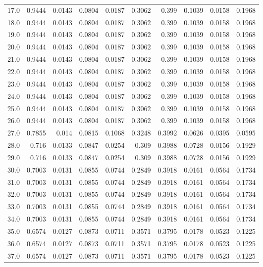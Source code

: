 \begin{longtable}{lrrrrrrrrr}
17.0 & 0.9444 & 0.0143 & 0.0804 & 0.0187 & 0.3062 & 0.399 & 0.1039 & 0.0158 & 0.1968 \\
18.0 & 0.9444 & 0.0143 & 0.0804 & 0.0187 & 0.3062 & 0.399 & 0.1039 & 0.0158 & 0.1968 \\
19.0 & 0.9444 & 0.0143 & 0.0804 & 0.0187 & 0.3062 & 0.399 & 0.1039 & 0.0158 & 0.1968 \\
20.0 & 0.9444 & 0.0143 & 0.0804 & 0.0187 & 0.3062 & 0.399 & 0.1039 & 0.0158 & 0.1968 \\
21.0 & 0.9444 & 0.0143 & 0.0804 & 0.0187 & 0.3062 & 0.399 & 0.1039 & 0.0158 & 0.1968 \\
22.0 & 0.9444 & 0.0143 & 0.0804 & 0.0187 & 0.3062 & 0.399 & 0.1039 & 0.0158 & 0.1968 \\
23.0 & 0.9444 & 0.0143 & 0.0804 & 0.0187 & 0.3062 & 0.399 & 0.1039 & 0.0158 & 0.1968 \\
24.0 & 0.9444 & 0.0143 & 0.0804 & 0.0187 & 0.3062 & 0.399 & 0.1039 & 0.0158 & 0.1968 \\
25.0 & 0.9444 & 0.0143 & 0.0804 & 0.0187 & 0.3062 & 0.399 & 0.1039 & 0.0158 & 0.1968 \\
26.0 & 0.9444 & 0.0143 & 0.0804 & 0.0187 & 0.3062 & 0.399 & 0.1039 & 0.0158 & 0.1968 \\
27.0 & 0.7855 & 0.014 & 0.0815 & 0.1068 & 0.3248 & 0.3992 & 0.0626 & 0.0395 & 0.0595 \\
28.0 & 0.716 & 0.0133 & 0.0847 & 0.0254 & 0.309 & 0.3988 & 0.0728 & 0.0156 & 0.1929 \\
29.0 & 0.716 & 0.0133 & 0.0847 & 0.0254 & 0.309 & 0.3988 & 0.0728 & 0.0156 & 0.1929 \\
30.0 & 0.7003 & 0.0131 & 0.0855 & 0.0744 & 0.2849 & 0.3918 & 0.0161 & 0.0564 & 0.1734 \\
31.0 & 0.7003 & 0.0131 & 0.0855 & 0.0744 & 0.2849 & 0.3918 & 0.0161 & 0.0564 & 0.1734 \\
32.0 & 0.7003 & 0.0131 & 0.0855 & 0.0744 & 0.2849 & 0.3918 & 0.0161 & 0.0564 & 0.1734 \\
33.0 & 0.7003 & 0.0131 & 0.0855 & 0.0744 & 0.2849 & 0.3918 & 0.0161 & 0.0564 & 0.1734 \\
34.0 & 0.7003 & 0.0131 & 0.0855 & 0.0744 & 0.2849 & 0.3918 & 0.0161 & 0.0564 & 0.1734 \\
35.0 & 0.6574 & 0.0127 & 0.0873 & 0.0711 & 0.3571 & 0.3795 & 0.0178 & 0.0523 & 0.1225 \\
36.0 & 0.6574 & 0.0127 & 0.0873 & 0.0711 & 0.3571 & 0.3795 & 0.0178 & 0.0523 & 0.1225 \\
37.0 & 0.6574 & 0.0127 & 0.0873 & 0.0711 & 0.3571 & 0.3795 & 0.0178 & 0.0523 & 0.1225 \\

\end{longtable}
